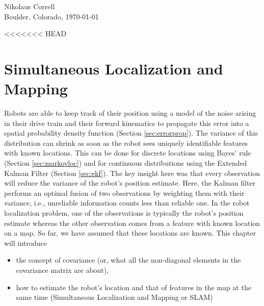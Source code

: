 \documentclass[paper=6.14in:9.21in,pagesize=pdftex,11pt,twoside,openright]{scrbook}
\begin{document}
\begin{flushright}
Nikolaus Correll\\
Boulder, Colorado, \today
\end{flushright}

% 
% 



<<<<<<< HEAD
% 
% 
% 
% 
% 
% 
% 
% 



\chapter{Simultaneous Localization and Mapping}\label{chap:slam}
Robots are able to keep track of their position using a model of the noise arising in their drive train and their forward kinematics to propagate this error into a spatial probability density function (Section \ref{sec:errorprop}). The variance of this distribution can shrink as soon as the robot sees uniquely identifiable features with known locations. This can be done for discrete locations using Bayes' rule (Section \ref{sec:markovloc}) and for continuous distributions using the Extended Kalman Filter (Section \ref{sec:ekf}). The key insight here was that every observation will reduce the variance of the robot's position estimate. Here, the Kalman filter performs an optimal fusion of two observations by weighting them with their variance, i.e., unreliable information counts less than reliable one. In the robot localization problem, one of the observations is typically the robot's position estimate whereas the other observation comes from a feature with known location on a map. So far, we have assumed that these locations are known. This chapter will introduce

\begin{itemize}
\item the concept of covariance (or, what all the non-diagonal elements in the covariance matrix are about),
\item how to estimate the robot's location and that of features in the map at the same time (Simultaneous Localization and Mapping or SLAM)
\end{itemize}
\end{document}
